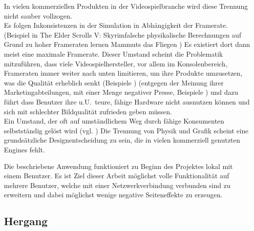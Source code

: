 In vielen kommerziellen Produkten in der Videospielbranche wird diese Trennung nicht sauber vollzogen.\\
Es folgen Inkonsistenzen in der Simulation in Abhängigkeit der Framerate.
(Beispiel in \glqq The Elder Scrolls V: Skyrim\grqq falsche physikalische Berechnungen auf Grund zu hoher Frameraten lernen Mammuts das Fliegen \cite{flying-fucking-mammoths})
Es existiert dort dann meist eine maximale Framerate.
Dieser Umstand scheint die Problematik mitzuführen, dass viele Videospielhersteller, vor allem im Konsolenbereich, Frameraten immer weiter nach unten limitieren, um ihre Produkte umzusetzen, was die Qualität erheblich senkt (Beispiele \cites{skyrim-physics-cap-and-fix, dark_souls-physics-cap-and-fix})
(entgegen der Meinung ihrer Marketingabteilungen, mit einer Menge negativer Presse, Beispiele \cites{morecinematic00, morecinematic01}
) und dazu führt dass Benutzer ihre u.U.~teure, fähige Hardware nicht ausnutzen können und sich mit schlechter Bildqualität zufrieden geben müssen.\\
Ein Umstand, der oft auf umständlichem Weg durch fähige Konsumenten selbstständig gelöst wird (vgl. \cites{skyrim-physics-cap-and-fix, dark_souls-physics-cap-and-fix})
Die Trennung von Physik und Grafik scheint eine grundsätzliche Designentscheidung zu sein, die in vielen kommerziell genutzten Engines fehlt.

Die beschriebene Anwendung funktioniert zu Beginn des Projektes lokal mit einem Benutzer. Es ist Ziel dieser Arbeit möglichst volle Funktionalität auf mehrere Benutzer, welche mit einer Netzwerkverbindung verbunden sind zu erweitern und dabei möglichst wenige negative Seiteneffekte zu erzeugen.

\subsection{Hergang}
